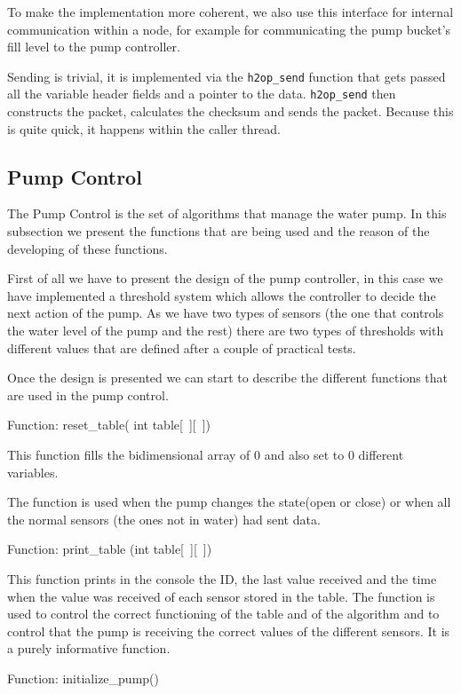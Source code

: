 \documentclass[11pt,paper=a4,parskip=half]{scrartcl}
\begin{document}
To make the implementation more coherent, we also use this interface for
internal communication within a node, for example for communicating the pump
bucket's fill level to the pump controller.


Sending is trivial, it is implemented via the \texttt{h2op\_\allowbreak send}
function that gets passed all the variable header fields and a pointer to the
data. \texttt{h2op\_\allowbreak send} then constructs the packet, calculates
the checksum and sends the packet. Because this is quite quick, it happens
within the caller thread.



\subsection{Pump Control}

The Pump Control is the set of algorithms that manage the water pump.
In this subsection we present the functions that are being used and the reason
of the developing of these functions.

First of all we have to present the design of the pump controller, in this case
we have implemented a threshold system which allows the controller to decide
the next action of the pump. As we have two types of sensors (the one that
controls the water level of the pump and the rest) there are two types of
thresholds with different values that are defined after a couple of practical
tests.

Once the design is presented we can start to describe the different functions
that are used in the pump control.

Function: reset\_table( int table[~][~])

This function  fills the bidimensional array of 0 and also set to 0 different variables.

The function is used when the pump changes the state(open or close) or when all
the normal sensors (the ones not in water) had sent data.

Function: print\_table (int table[~][~])

This function prints in the console the ID, the last value received and the
time when the value was received of each sensor stored in the table.
The function is used to control the correct functioning of the table and of the
algorithm and to control that the pump is receiving the correct values of the
different sensors.
It is a purely informative function.

Function: initialize\_pump()
\end{document}
